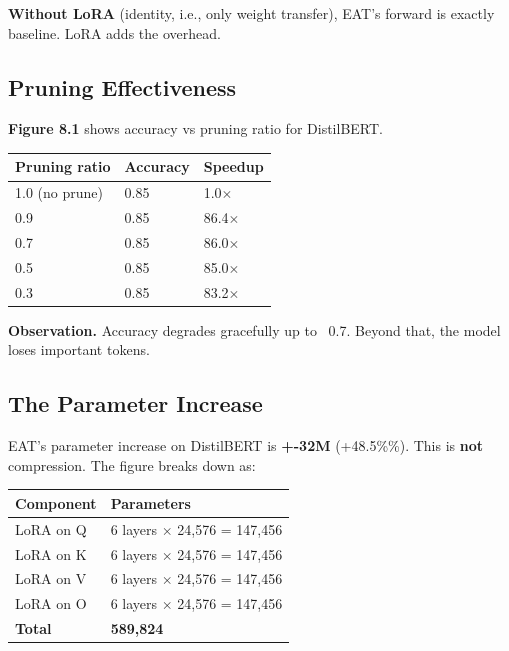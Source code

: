 \textbf{Without LoRA} (identity, i.e., only weight transfer), EAT's forward is 
exactly baseline. LoRA adds the overhead.

\subsection{Pruning Effectiveness}

\textbf{Figure 8.1} shows accuracy vs pruning ratio for DistilBERT.

\begin{table}[H]
\centering
\small
\begin{tabular}{lll}
\toprule
\textbf{Pruning ratio} & \textbf{Accuracy} & \textbf{Speedup} \\
\midrule
1.0 (no prune) & 0.85 & 1.0$\times$ \\
0.9 & 0.85 & 86.4$\times$ \\
0.7 & 0.85 & 86.0$\times$ \\
0.5 & 0.85 & 85.0$\times$ \\
0.3 & 0.85 & 83.2$\times$ \\
\bottomrule
\end{tabular}
\end{table}

\textbf{Observation.} Accuracy degrades gracefully up to ~0.7. Beyond that, the 
model loses important tokens.

\subsection{The Parameter Increase}

EAT's parameter increase on DistilBERT is \textbf{+-32M} 
(+48.5\%\%). This is \textbf{not} compression. The figure breaks down as:

\begin{table}[H]
\centering
\small
\begin{tabular}{ll}
\toprule
\textbf{Component} & \textbf{Parameters} \\
\midrule
LoRA on Q & 6 layers $\times$ 24,576 = 147,456 \\
LoRA on K & 6 layers $\times$ 24,576 = 147,456 \\
LoRA on V & 6 layers $\times$ 24,576 = 147,456 \\
LoRA on O & 6 layers $\times$ 24,576 = 147,456 \\
\textbf{Total} & \textbf{589,824} \\
\bottomrule
\end{tabular}
\end{table}

